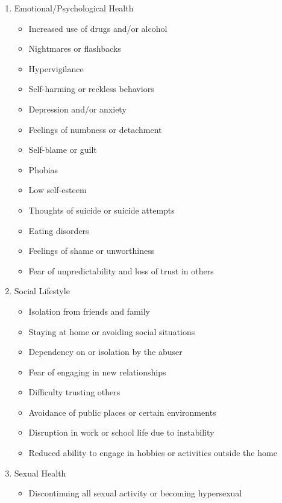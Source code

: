 \documentclass[letterpaper, 10pt]{article}
\begin{document}
\begin{enumerate}
\begin{enumerate}
\begin{itemize}
        \end{itemize}
        \item Emotional/Psychological Health
        \begin{itemize}
            \item Increased use of drugs and/or alcohol
            \item Nightmares or flashbacks
            \item Hypervigilance
            \item Self-harming or reckless behaviors
            \item Depression and/or anxiety
            \item Feelings of numbness or detachment
            \item Self-blame or guilt
            \item Phobias
            \item Low self-esteem
            \item Thoughts of suicide or suicide attempts
            \item Eating disorders
            \item Feelings of shame or unworthiness
            \item Fear of unpredictability and loss of trust in others
        \end{itemize}
        \item Social Lifestyle
        \begin{itemize}
            \item Isolation from friends and family
            \item Staying at home or avoiding social situations
            \item Dependency on or isolation by the abuser
            \item Fear of engaging in new relationships
            \item Difficulty trusting others
            \item Avoidance of public places or certain environments
            \item Disruption in work or school life due to instability
            \item Reduced ability to engage in hobbies or activities outside the home
        \end{itemize}
        \item Sexual Health
        \begin{itemize}
            \item Discontinuing all sexual activity or becoming hypersexual

\end{itemize}
\end{enumerate}
\end{enumerate}
\end{document}
